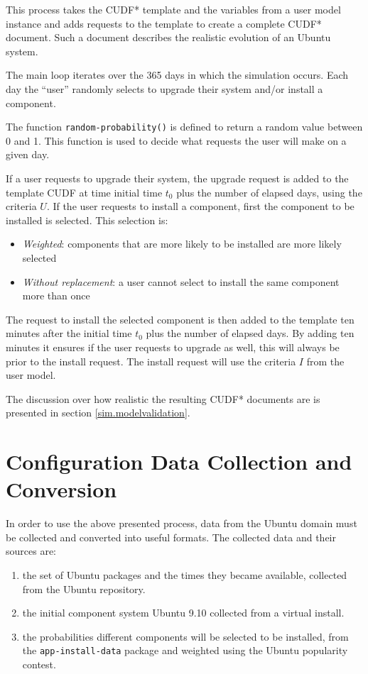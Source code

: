 This process takes the CUDF* template and the variables from a user model instance and adds requests to the template to  create a complete CUDF* document.
Such a document describes the realistic evolution of an Ubuntu system.

The main loop iterates over the 365 days in which the simulation occurs.
Each day the ``user'' randomly selects to upgrade their system and/or install a component.

The function \texttt{random-probability()} is defined to return a random value between 0 and 1.
This function is used to decide what requests the user will make on a given day.

If a user requests to upgrade their system, the upgrade request is added to the template CUDF at time initial time $t_0$ plus the number of elapsed days, using the criteria $U$.
If the user requests to install a component, first the component to be installed is selected.
This selection is: 
\begin{itemize}
  \item \textit{Weighted}: components that are more likely to be installed are more likely selected
  \item \textit{Without replacement}: a user cannot select to install the same component more than once
\end{itemize} 
The request to install the selected component is then added to the template ten minutes after the initial time $t_0$ plus the number of elapsed days.
By adding ten minutes it ensures if the user requests to upgrade as well, this will always be prior to the install request.
The install request will use the criteria $I$ from the user model.

The discussion over how realistic the resulting CUDF* documents are is presented in section \ref{sim.modelvalidation}.
\section{Configuration Data Collection and Conversion}
\label{sim.collection}
In order to use the above presented process, data from the Ubuntu domain must be collected and converted into useful formats.
The collected data and their sources are:
\begin{enumerate}
  \item the set of Ubuntu packages and the times they became available, collected from the Ubuntu repository.
  \item the initial component system Ubuntu 9.10 collected from a virtual install.
  \item the probabilities different components will be selected to be installed, from the \texttt{app-install-data} package and weighted using the Ubuntu popularity contest.
\end{enumerate}

